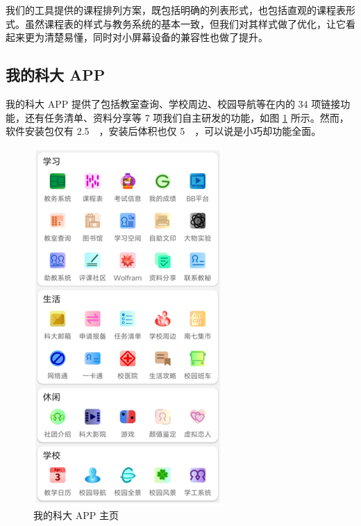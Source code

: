 我们的工具提供的课程排列方案，既包括明确的列表形式，也包括直观的课程表形式。虽然课程表的样式与教务系统的基本一致，但我们对其样式做了优化，让它看起来更为清楚易懂，同时对小屏幕设备的兼容性也做了提升。

\subsection{我的科大 APP}

我的科大 APP 提供了包括教室查询、学校周边、校园导航等在内的 34 项链接功能，还有任务清单、资料分享等 7 项我们自主研发的功能，如图 \ref{fig:m1} 所示。然而，软件安装包仅有 \qty{2.5}{\mega\byte}，安装后体积也仅 \qty{5}{\mega\byte}，可以说是小巧却功能全面。

\begin{figure}[htb]
  \centering
  \includegraphics[width=0.8\columnwidth]{figure/m1.png}
  \caption{我的科大 APP 主页}
  \label{fig:m1}
\end{figure}

